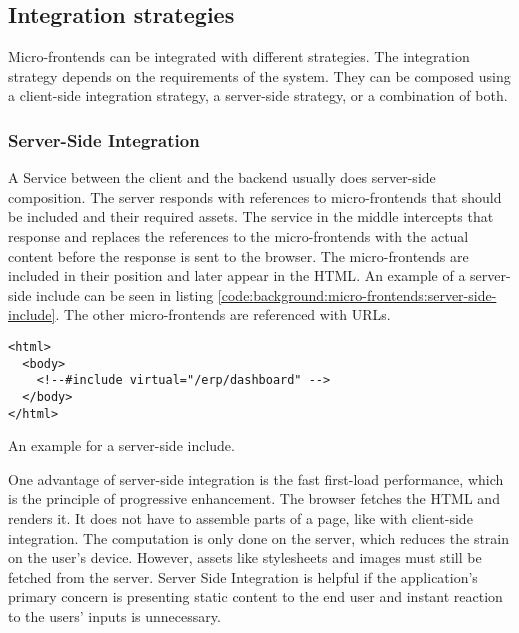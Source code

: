 \subsection{Integration strategies}\label{subsection:background:micro-frontend-architecture:integration-strategies}

Micro-frontends can be integrated with different strategies. The integration strategy depends on the requirements of the system. They can be composed using a client-side integration strategy, a server-side strategy, or a combination of both.

\subsubsection{Server-Side Integration}\label{subsubsection:background:micro-frontend-architecture:integration-strategies:server-side-integration}

A Service between the client and the backend usually does server-side composition. \cite[60]{book:2020:geers:background:micro-frontends:micro-frontends-in-action} The server responds with references to micro-frontends that should be included and their required assets. The service in the middle intercepts that response and replaces the references to the micro-frontends with the actual content before the response is sent to the browser. The micro-frontends are included in their position and later appear in the \ac{HTML}. An example of a server-side include can be seen in listing \ref{code:background:micro-frontends:server-side-include}. The other micro-frontends are referenced with \acp{URL}. \cite[61-63]{book:2020:geers:background:micro-frontends:micro-frontends-in-action}

\ifshowListings
\begin{listing}[H]
    \begin{verbatim}
<html>
  <body>
    <!--#include virtual="/erp/dashboard" -->
  </body>
</html>
    \end{verbatim}
    \caption{An example for a server-side include.}\label{code:background:micro-frontends:server-side-include}
\end{listing}
\fi

\bigskip

\noindent One advantage of server-side integration is the fast first-load performance, which is the principle of progressive enhancement. \cite{book:2010:parker:background:micro-frontends:designing-with-progressive-enhancement} The browser fetches the \ac{HTML} and renders it. It does not have to assemble parts of a page, like with client-side integration. The computation is only done on the server, which reduces the strain on the user's device. \cite{book:2020:geers:background:micro-frontends:micro-frontends-in-action} However, assets like stylesheets and images must still be fetched from the server. Server Side Integration is helpful if the application's primary concern is presenting static content to the end user and instant reaction to the users' inputs is unnecessary.  \cite[83]{book:2020:geers:background:micro-frontends:micro-frontends-in-action}

